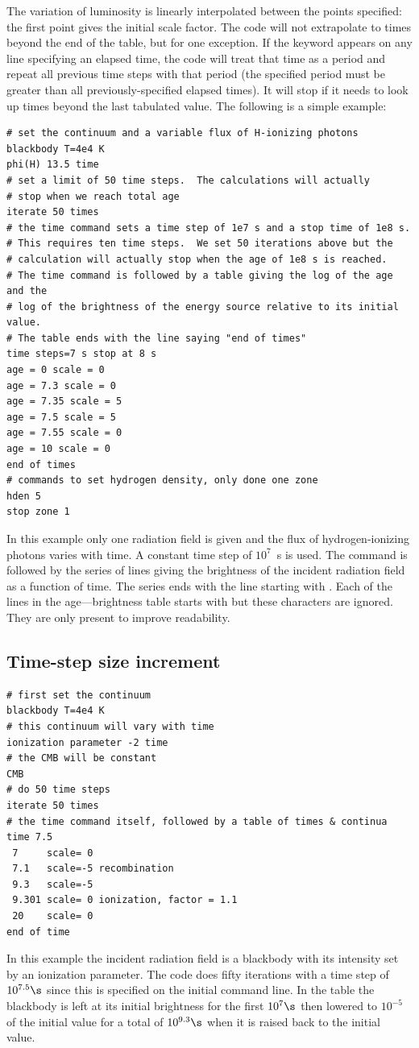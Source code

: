 \begin{shaded}
The variation of luminosity is linearly interpolated between the 
points specified: the first point gives the initial scale factor.
The code will not extrapolate to times
beyond the end of the table, but for one exception.  If the keyword 
appears on any line specifying an elapsed time, the code will treat that time as a
period and repeat all previous time steps with that period (the specified period
must be greater than all previously-specified elapsed times).
It will stop if it needs to look up times
beyond the last tabulated value.
The following is a simple example:
\begin{verbatim}
# set the continuum and a variable flux of H-ionizing photons
blackbody T=4e4 K
phi(H) 13.5 time
# set a limit of 50 time steps.  The calculations will actually
# stop when we reach total age
iterate 50 times
# the time command sets a time step of 1e7 s and a stop time of 1e8 s.
# This requires ten time steps.  We set 50 iterations above but the
# calculation will actually stop when the age of 1e8 s is reached.
# The time command is followed by a table giving the log of the age and the
# log of the brightness of the energy source relative to its initial value.
# The table ends with the line saying "end of times"
time steps=7 s stop at 8 s
age = 0 scale = 0
age = 7.3 scale = 0
age = 7.35 scale = 5
age = 7.5 scale = 5
age = 7.55 scale = 0
age = 10 scale = 0
end of times
# commands to set hydrogen density, only done one zone
hden 5
stop zone 1
\end{verbatim}

In this example only one radiation field is given and the flux of
hydrogen-ionizing photons varies with time.  A constant time step of $10^7$~s is used.
The  command is followed by the series of lines giving the
brightness of the incident radiation field as a function of time.
The series ends with the line
starting with .
Each of the lines in the age---brightness table starts
with  but these characters are ignored.
They are only present to improve readability.

\subsection{Time-step size increment}
\begin{verbatim}
# first set the continuum
blackbody T=4e4 K
# this continuum will vary with time
ionization parameter -2 time
# the CMB will be constant
CMB
# do 50 time steps
iterate 50 times
# the time command itself, followed by a table of times & continua
time 7.5
 7     scale= 0
 7.1   scale=-5 recombination
 9.3   scale=-5
 9.301 scale= 0 ionization, factor = 1.1
 20    scale= 0
end of time
\end{verbatim}
In this example the incident radiation field is a blackbody
with its intensity set by an ionization parameter.
The code does fifty iterations with a time step of
$10^{7.5} \s$ since this is specified on the initial  command line.
In the
table the blackbody is left at its initial brightness
for the first $10^7 \s$ then
lowered to $10^{-5}$ of the initial value
for a total of $10^{9.3} \s$ when it is
raised back to the initial value.


\end{shaded}
